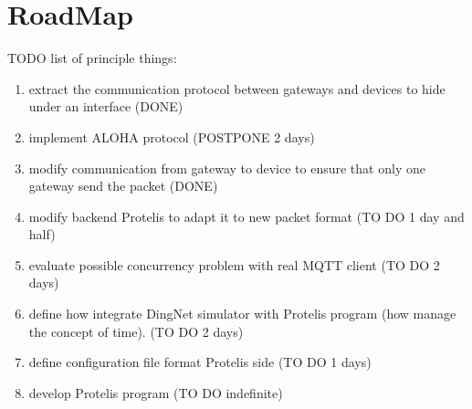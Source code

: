 \chapter{RoadMap}

TODO list of principle things:
\begin{enumerate}
    \item extract the communication protocol between gateways and devices to hide under an interface (DONE)
    \item implement ALOHA protocol (POSTPONE 2 days)
    \item modify communication from gateway to device to ensure that only one gateway send the packet (DONE)
    \item modify backend Protelis to adapt it to new packet format (TO DO 1 day and half)
    \item evaluate possible concurrency problem with real MQTT client (TO DO 2 days)
    \item define how integrate DingNet simulator with Protelis program (how manage the concept of time). (TO DO 2 days)
    \item define configuration file format Protelis side (TO DO 1 days)
    \item develop Protelis program (TO DO indefinite)
\end{enumerate}